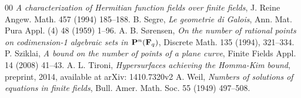 \documentclass[a4paper,11pt]{article}
\begin{document}
\begin{thebibliography}{00}
{\em A characterization of Hermitian function fields over finite fields},
J. Reine Angew. Math. 457 (1994) 185--188. 
B. Segre,
{\em Le geometrie di Galois},
Ann. Mat. Pura Appl. (4) 48 (1959) 1--96.
A. B. S{\o}rensen,
{\em On the number of rational points on codimension-1 
algebraic sets in ${\bf P}^n({\bf F}_q)$},
Discrete Math. 135 (1994), 321--334.
P. Sziklai,
{\em A bound on the number of points of a plane curve}, 
Finite Fields Appl. 14 (2008) 41--43.
A. L. Tironi,
{\em Hypersurfaces achieving the Homma-Kim bound},
preprint, 2014, available at arXiv: 1410.7320v2
A. Weil,
{\em Numbers of solutions of equations in finite fields},
Bull. Amer. Math. Soc. 55 (1949) 497--508.
\end{thebibliography}
\end{document}

